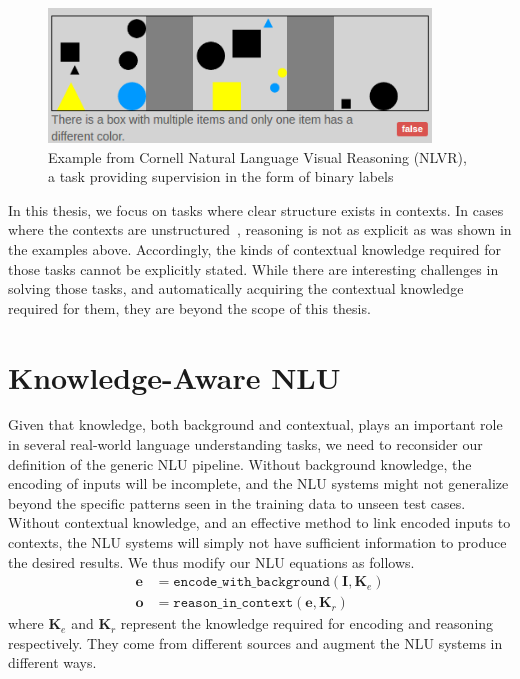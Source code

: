 \begin{figure} \begin{center} \includegraphics[width=4in]{figures/nlvr_example.png} \caption{Example
from Cornell Natural Language Visual Reasoning (NLVR), a task providing supervision in the form of
binary labels}\label{fig:nlvr_example_intro} \end{center} \end{figure}

In this thesis, we focus on tasks where clear structure exists in contexts. In cases where the
contexts are
unstructured~\citep{hill2015goldilocks,richardson2013mctest,penas2013qa4mre,breck2001looking},
reasoning is not as explicit as was shown in the examples above. Accordingly, the kinds of
contextual knowledge required for those tasks cannot be explicitly stated.  While there are
interesting challenges in solving those tasks, and automatically acquiring the contextual knowledge
required for them, they are beyond the scope of this thesis.

\section{Knowledge-Aware NLU} Given that knowledge, both background and contextual, plays an
important role in several real-world language understanding tasks, we need to reconsider our
definition of the generic NLU pipeline.  Without background knowledge, the encoding of inputs will
be incomplete, and the NLU systems might not generalize beyond the specific patterns seen in the
training data to unseen test cases. Without contextual knowledge, and an effective method to link
encoded inputs to contexts, the NLU systems will simply not have sufficient information to produce
the desired results. We thus modify our NLU equations as follows.  \begin{align} \mathbf{e} &=
\mathtt{encode\_with\_background}(\mathbf{I}, \mathbf{K}_e) \label{eq:encoding_with_knowledge}\\
\mathbf{o} &= \mathtt{reason\_in\_context}(\mathbf{e}, \mathbf{K}_r)
\label{eq:reasoning_with_knowledge} \end{align} where $\mathbf{K}_e$ and $\mathbf{K}_r$ represent
the knowledge required for encoding and reasoning respectively. They come from different sources and
augment the NLU systems in different ways.

